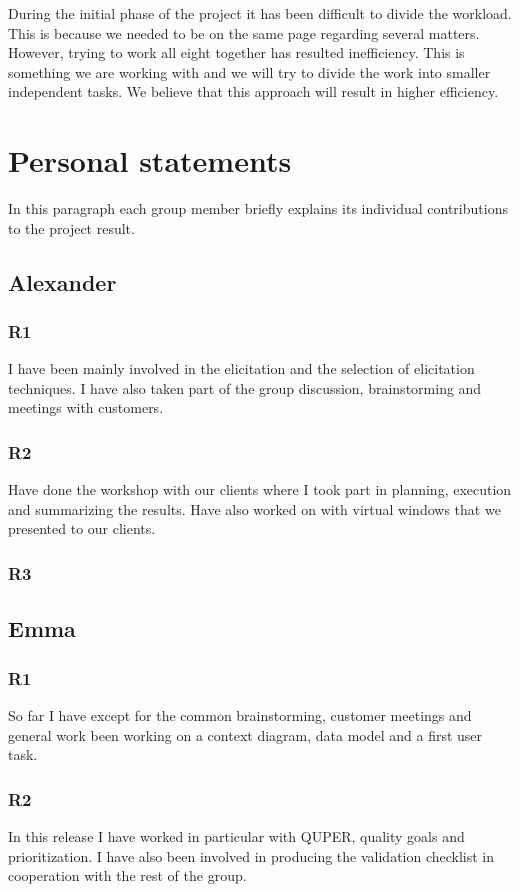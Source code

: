 \documentclass[a4paper]{article}
\begin{document}
During the initial phase of the project it has been difficult to divide the workload. This is because we needed to be on the same page regarding several matters. However, trying to work all eight together has resulted inefficiency. This is something we are working with and we will try to divide the work into smaller independent tasks. We believe that this approach will result in higher efficiency.


	\section{Personal statements}
In this paragraph each group member briefly explains its individual contributions to the project result.
	
	\subsection{Alexander}
		\subsubsection{R1}
		I have been mainly involved in the elicitation and the selection of elicitation techniques. I have also taken part of the group discussion, brainstorming and meetings with customers.
		\subsubsection{R2}
		Have done the workshop with our clients where I took part in planning, execution and summarizing the results. Have also worked on with virtual windows that we presented to our clients.
		\subsubsection{R3}
	
	\subsection{Emma}
		\subsubsection{R1}
		So far I have except for the common brainstorming, customer meetings and general work been working on a context diagram, data model and a first user task.
		\subsubsection{R2}
	In this release I have worked in particular with QUPER, quality goals and prioritization. I have also been involved in producing the validation checklist in cooperation with the rest of the group.
\end{document}
